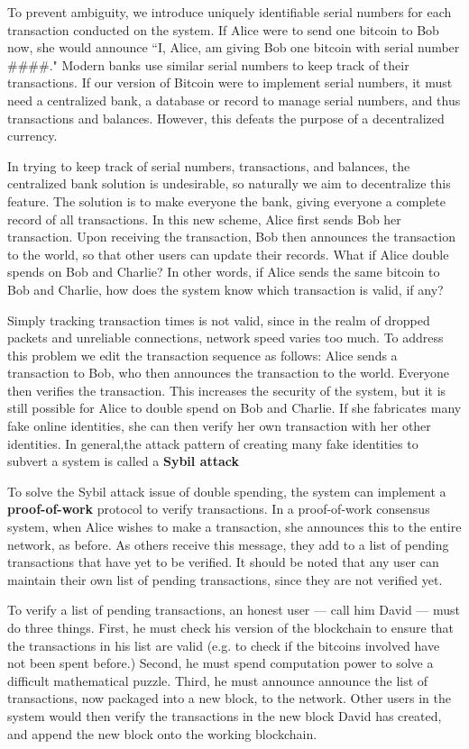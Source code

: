 \documentclass[11pt]{article}
\begin{document}
    To prevent ambiguity, we introduce uniquely identifiable serial numbers for each transaction conducted on the system. If Alice were to send one bitcoin to Bob now, she would announce ``I, Alice, am giving Bob one bitcoin with serial number \#\#\#\#." Modern banks use similar serial numbers to keep track of their transactions. If our version of Bitcoin were to implement serial numbers, it must need a centralized bank, a database or record to manage serial numbers, and thus transactions and balances. However, this defeats the purpose of a decentralized currency. 
    
    In trying to keep track of serial numbers, transactions, and balances, the centralized bank solution is undesirable, so naturally we aim to decentralize this feature. The solution is to make everyone the bank, giving everyone a complete record of all transactions. In this new scheme, Alice first sends Bob her transaction. Upon receiving the transaction, Bob then announces the transaction to the world, so that other users can update their records. What if Alice double spends on Bob and Charlie? In other words, if Alice sends the same bitcoin to Bob and Charlie, how does the system know which transaction is valid, if any? 
    
    Simply tracking transaction times is not valid, since in the realm of dropped packets and unreliable connections, network speed varies too much. To address this problem we edit the transaction sequence as follows: Alice sends a transaction to Bob, who then announces the transaction to the world. Everyone then verifies the transaction. This increases the security of the system, but it is still possible for Alice to double spend on Bob and Charlie. If she fabricates many fake online identities, she can then verify her own transaction with her other identities. In general,the attack pattern of creating many fake identities to subvert a system is called a \textbf{Sybil attack}
    
    To solve the Sybil attack issue of double spending, the system can implement a \textbf{proof-of-work} protocol to verify transactions. In a proof-of-work consensus system, when Alice wishes to make a transaction, she announces this to the entire network, as before. As others receive this message, they add to a list of pending transactions that have yet to be verified. It should be noted that any user can maintain their own list of pending transactions, since they are not verified yet.
    
    To verify a list of pending transactions, an honest user --- call him David --- must do three things. First, he must check his version of the blockchain to ensure that the transactions in his list are valid (e.g. to check if the bitcoins involved have not been spent before.) Second, he must spend computation power to solve a difficult mathematical puzzle. Third, he must announce announce the list of transactions, now packaged into a new block, to the network. Other users in the system would then verify the transactions in the new block David has created, and append the new block onto the working blockchain.
    
\end{document}
